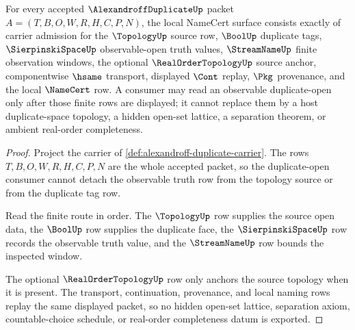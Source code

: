 \begin{theorem}
\label{thm:alexandroff-duplicate-namecert-obligations}
For every accepted $\AlexandroffDuplicateUp$ packet $A=(T,B,O,W,R,H,C,P,N)$, the local NameCert surface consists exactly of carrier admission for the $\TopologyUp$ source row, $\BoolUp$ duplicate tags, $\SierpinskiSpaceUp$ observable-open truth values, $\StreamNameUp$ finite observation windows, the optional $\RealOrderTopologyUp$ source anchor, componentwise $\hsame$ transport, displayed $\Cont$ replay, $\Pkg$ provenance, and the local $\NameCert$ row. A consumer may read an observable duplicate-open only after those finite rows are displayed; it cannot replace them by a host duplicate-space topology, a hidden open-set lattice, a separation theorem, or ambient real-order completeness.
\end{theorem}
\begin{proof}
Project the carrier of \autoref{def:alexandroff-duplicate-carrier}. The rows $T,B,O,W,R,H,C,P,N$ are the whole accepted packet, so the duplicate-open consumer cannot detach the observable truth row from the topology source or from the duplicate tag row.

Read the finite route in order. The $\TopologyUp$ row supplies the source open data, the $\BoolUp$ row supplies the duplicate face, the $\SierpinskiSpaceUp$ row records the observable truth value, and the $\StreamNameUp$ row bounds the inspected window.

The optional $\RealOrderTopologyUp$ row only anchors the source topology when it is present. The transport, continuation, provenance, and local naming rows replay the same displayed packet, so no hidden open-set lattice, separation axiom, countable-choice schedule, or real-order completeness datum is exported.
\end{proof}



